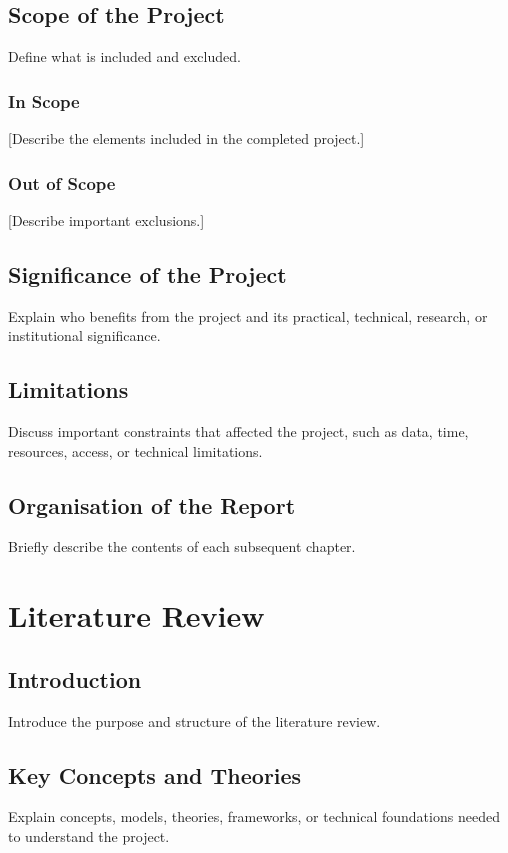 \documentclass[12pt,a4paper]{report}
\begin{document}
\section{Scope of the Project}
Define what is included and excluded.

\subsection{In Scope}
[Describe the elements included in the completed project.]

\subsection{Out of Scope}
[Describe important exclusions.]

\section{Significance of the Project}
Explain who benefits from the project and its practical, technical, research, or institutional significance.

\section{Limitations}
Discuss important constraints that affected the project, such as data, time, resources, access, or technical limitations.

\section{Organisation of the Report}
Briefly describe the contents of each subsequent chapter.

\chapter{Literature Review}

\section{Introduction}
Introduce the purpose and structure of the literature review.

\section{Key Concepts and Theories}
Explain concepts, models, theories, frameworks, or technical foundations needed to understand the project.
\end{document}
